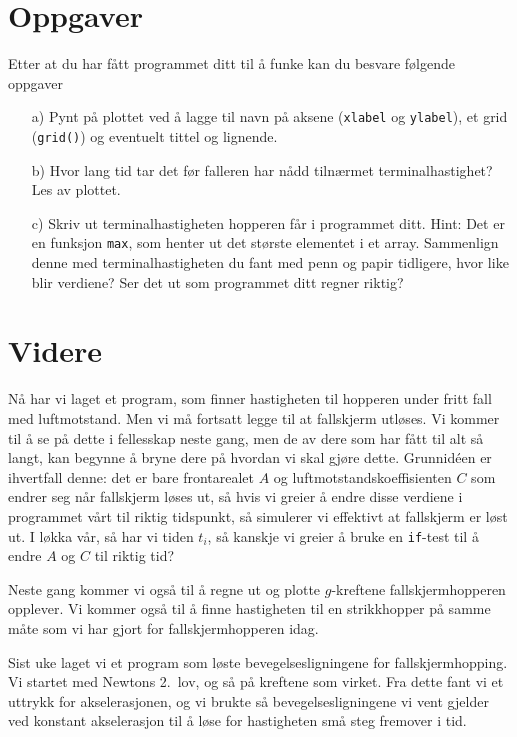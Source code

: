 \documentclass[a4paper, 11pt, notitlepage]{article}
\begin{document}
\section*{Oppgaver}
Etter at du har fått programmet ditt til å funke kan du besvare følgende oppgaver
\begin{itemize}
    \item[a)] Pynt på plottet ved å lagge til navn på aksene (\verb+xlabel+ og \verb+ylabel+), et grid (\verb+grid()+) og eventuelt tittel og lignende.
    \item[b)] Hvor lang tid tar det før falleren har nådd tilnærmet terminalhastighet? Les av plottet.
    \item[c)] Skriv ut terminalhastigheten hopperen får i programmet ditt. Hint: Det er en funksjon \verb+max+, som henter ut det største elementet i et array. Sammenlign denne med terminalhastigheten du fant med penn og papir tidligere, hvor like blir verdiene? Ser det ut som programmet ditt regner riktig?
\end{itemize}

\clearpage

\section*{Videre}
Nå har vi laget et program, som finner hastigheten til hopperen under fritt fall med luftmotstand. Men vi må fortsatt legge til at fallskjerm utløses. Vi kommer til å se på dette i fellesskap neste gang, men de av dere som har fått til alt så langt, kan begynne å bryne dere på hvordan vi skal gjøre dette. Grunnidéen er ihvertfall denne: det er bare frontarealet $A$ og luftmotstandskoeffisienten $C$ som endrer seg når fallskjerm løses ut, så hvis vi greier å endre disse verdiene i programmet vårt til riktig tidspunkt, så simulerer vi effektivt at fallskjerm er løst ut. I løkka vår, så har vi tiden $t_i$, så kanskje vi greier å bruke en \verb+if+-test til å endre $A$ og $C$ til riktig tid?

Neste gang kommer vi også til å regne ut og plotte $g$-kreftene fallskjermhopperen opplever. Vi kommer også til å finne hastigheten til en strikkhopper på samme måte som vi har gjort for fallskjermhopperen idag.


Sist uke laget vi et program som løste bevegelsesligningene for fallskjermhopping. Vi startet med Newtons 2.\ lov, og så på kreftene som virket. Fra dette fant vi et uttrykk for akselerasjonen, og vi brukte så bevegelsesligningene vi vent gjelder ved konstant akselerasjon til å løse for hastigheten små steg fremover i tid.
\end{document}
